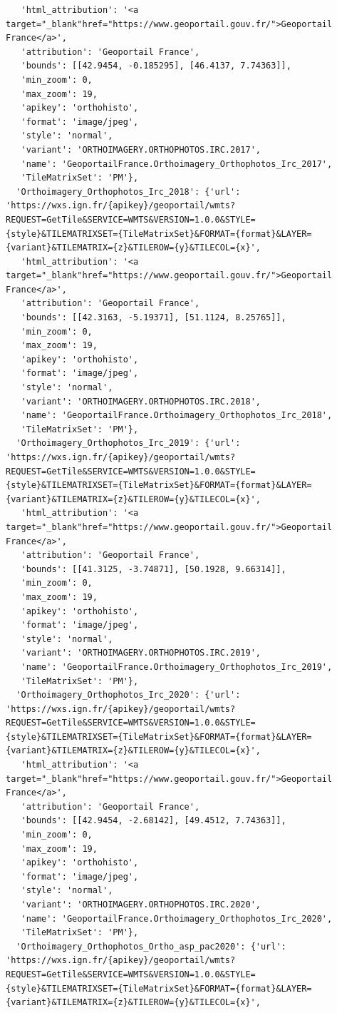 \documentclass[
  letterpaper,
  DIV=11,
  numbers=noendperiod]{scrreprt}
\begin{document}
\begin{verbatim}
   'html_attribution': '<a target="_blank"href="https://www.geoportail.gouv.fr/">Geoportail France</a>',
   'attribution': 'Geoportail France',
   'bounds': [[42.9454, -0.185295], [46.4137, 7.74363]],
   'min_zoom': 0,
   'max_zoom': 19,
   'apikey': 'orthohisto',
   'format': 'image/jpeg',
   'style': 'normal',
   'variant': 'ORTHOIMAGERY.ORTHOPHOTOS.IRC.2017',
   'name': 'GeoportailFrance.Orthoimagery_Orthophotos_Irc_2017',
   'TileMatrixSet': 'PM'},
  'Orthoimagery_Orthophotos_Irc_2018': {'url': 'https://wxs.ign.fr/{apikey}/geoportail/wmts?REQUEST=GetTile&SERVICE=WMTS&VERSION=1.0.0&STYLE={style}&TILEMATRIXSET={TileMatrixSet}&FORMAT={format}&LAYER={variant}&TILEMATRIX={z}&TILEROW={y}&TILECOL={x}',
   'html_attribution': '<a target="_blank"href="https://www.geoportail.gouv.fr/">Geoportail France</a>',
   'attribution': 'Geoportail France',
   'bounds': [[42.3163, -5.19371], [51.1124, 8.25765]],
   'min_zoom': 0,
   'max_zoom': 19,
   'apikey': 'orthohisto',
   'format': 'image/jpeg',
   'style': 'normal',
   'variant': 'ORTHOIMAGERY.ORTHOPHOTOS.IRC.2018',
   'name': 'GeoportailFrance.Orthoimagery_Orthophotos_Irc_2018',
   'TileMatrixSet': 'PM'},
  'Orthoimagery_Orthophotos_Irc_2019': {'url': 'https://wxs.ign.fr/{apikey}/geoportail/wmts?REQUEST=GetTile&SERVICE=WMTS&VERSION=1.0.0&STYLE={style}&TILEMATRIXSET={TileMatrixSet}&FORMAT={format}&LAYER={variant}&TILEMATRIX={z}&TILEROW={y}&TILECOL={x}',
   'html_attribution': '<a target="_blank"href="https://www.geoportail.gouv.fr/">Geoportail France</a>',
   'attribution': 'Geoportail France',
   'bounds': [[41.3125, -3.74871], [50.1928, 9.66314]],
   'min_zoom': 0,
   'max_zoom': 19,
   'apikey': 'orthohisto',
   'format': 'image/jpeg',
   'style': 'normal',
   'variant': 'ORTHOIMAGERY.ORTHOPHOTOS.IRC.2019',
   'name': 'GeoportailFrance.Orthoimagery_Orthophotos_Irc_2019',
   'TileMatrixSet': 'PM'},
  'Orthoimagery_Orthophotos_Irc_2020': {'url': 'https://wxs.ign.fr/{apikey}/geoportail/wmts?REQUEST=GetTile&SERVICE=WMTS&VERSION=1.0.0&STYLE={style}&TILEMATRIXSET={TileMatrixSet}&FORMAT={format}&LAYER={variant}&TILEMATRIX={z}&TILEROW={y}&TILECOL={x}',
   'html_attribution': '<a target="_blank"href="https://www.geoportail.gouv.fr/">Geoportail France</a>',
   'attribution': 'Geoportail France',
   'bounds': [[42.9454, -2.68142], [49.4512, 7.74363]],
   'min_zoom': 0,
   'max_zoom': 19,
   'apikey': 'orthohisto',
   'format': 'image/jpeg',
   'style': 'normal',
   'variant': 'ORTHOIMAGERY.ORTHOPHOTOS.IRC.2020',
   'name': 'GeoportailFrance.Orthoimagery_Orthophotos_Irc_2020',
   'TileMatrixSet': 'PM'},
  'Orthoimagery_Orthophotos_Ortho_asp_pac2020': {'url': 'https://wxs.ign.fr/{apikey}/geoportail/wmts?REQUEST=GetTile&SERVICE=WMTS&VERSION=1.0.0&STYLE={style}&TILEMATRIXSET={TileMatrixSet}&FORMAT={format}&LAYER={variant}&TILEMATRIX={z}&TILEROW={y}&TILECOL={x}',

\end{verbatim}
\end{document}
